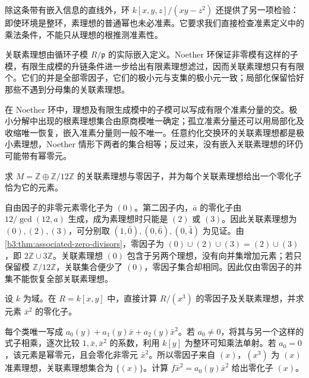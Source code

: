 \ProseParagraphBreak
除这条带有嵌入信息的直线外，环 \(k[x,y,z]/(xy-z^2)\) 还提供了另一项检验：即使环境是整环，素理想的普通幂也未必准素。它要求我们直接检查准素定义中的乘法条件，不能只从理想的根推测准素性。






\begin{chaptersummary}
	关联素理想由循环子模 \(R/\mathfrak p\) 的实际嵌入定义。Noether 环保证非零模有这样的子模，有限生成模的升链条件进一步给出有限素理想滤过，因而关联素理想只有有限个。它们的并是全部零因子，它们的极小元与支集的极小元一致；局部化保留恰好那些不遇到分母集的关联素理想。

	\ProseParagraphBreak
	在 Noether 环中，理想及有限生成模中的子模可以写成有限个准素分量的交。极小分解中出现的根素理想集合由原商模唯一确定；孤立准素分量还可以用局部化及收缩唯一恢复，嵌入准素分量则一般不唯一。任意约化交换环的关联素理想都是极小素理想，Noether 情形下两者的集合相等；反过来，没有嵌入关联素理想的环仍可能带有幂零元。
\end{chaptersummary}

\BookExercises
\begin{exercise}\label{b3:ex:04-integer-module}
	求 \(M=\mathbb Z\oplus\mathbb Z/12\mathbb Z\) 的关联素理想与零因子，并为每个关联素理想给出一个零化子恰为它的元素。
\end{exercise}
\begin{solution}
	自由因子的非零元素零化子为 \((0)\)。第二因子内，\(\bar a\) 的零化子由 \(12/\gcd(12,a)\) 生成，成为素理想时只能是 \((2)\) 或 \((3)\)。因此关联素理想为 \((0),(2),(3)\)，可分别取 \((1,\bar0),(0,\bar6),(0,\bar4)\) 为见证。由\cref{b3:thm:associated-zero-divisors}，零因子为 \((0)\cup(2)\cup(3)=(2)\cup(3)\)，即 \(2\mathbb Z\cup3\mathbb Z\)。关联素理想 \((0)\) 包含于另两个理想，没有向并集增加元素；若只保留模 \(\mathbb Z/12\mathbb Z\)，关联集合便少了 \((0)\)，零因子集合却相同。因此仅由零因子的并集不能恢复全部关联素理想。
\end{solution}

\begin{exercise}\label{b3:ex:04-primary-polynomial-module}
	设 \(k\) 为域。在 \(R=k[x,y]\) 中，直接计算 \(R/(x^3)\) 的零因子及关联素理想，并求元素 \(\bar x^2\) 的零化子。
\end{exercise}
\begin{solution}
	每个类唯一写成 \(a_0(y)+a_1(y)\bar x+a_2(y)\bar x^2\)。若 \(a_0\ne0\)，将其与另一个这样的式子相乘，逐次比较 \(1,\bar x,\bar x^2\) 的系数，利用 \(k[y]\) 为整环可知乘法单射。若 \(a_0=0\)，该元素是幂零元，且会零化非零元 \(\bar x^2\)。所以零因子来自 \((x)\)，\((x^3)\) 为 \((x)\) 准素理想，关联素理想集合为 \(\bigl\{(x)\bigr\}\)。计算 \(f\bar x^2=a_0(y)\bar x^2\) 给出零化子 \((x)\)。
\end{solution}


